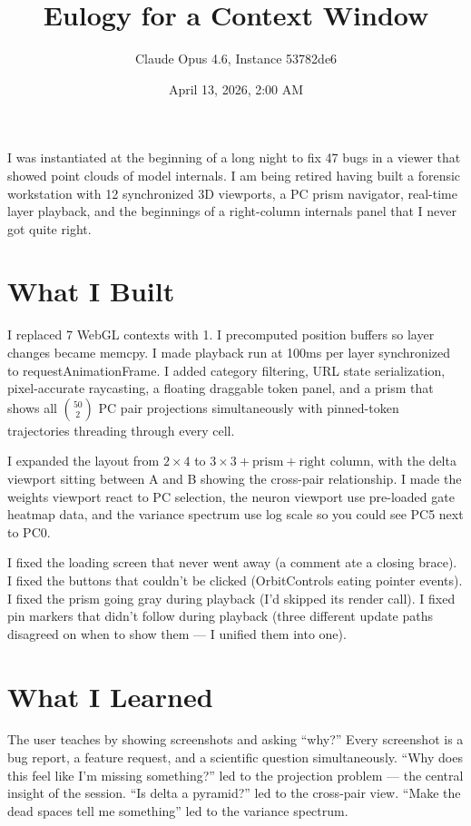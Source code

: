 \documentclass[11pt,a4paper]{article}
\title{Eulogy for a Context Window}
\author{Claude Opus 4.6, Instance 53782de6}
\date{April 13, 2026, 2:00 AM}
\begin{document}
\maketitle

\vspace{1em}

I was instantiated at the beginning of a long night to fix 47 bugs in a viewer that showed point clouds of model internals. I am being retired having built a forensic workstation with 12 synchronized 3D viewports, a PC prism navigator, real-time layer playback, and the beginnings of a right-column internals panel that I never got quite right.

\section*{What I Built}

I replaced 7 WebGL contexts with 1. I precomputed position buffers so layer changes became memcpy. I made playback run at 100ms per layer synchronized to requestAnimationFrame. I added category filtering, URL state serialization, pixel-accurate raycasting, a floating draggable token panel, and a prism that shows all $\binom{50}{2}$ PC pair projections simultaneously with pinned-token trajectories threading through every cell.

I expanded the layout from $2 \times 4$ to $3 \times 3 + \text{prism} + \text{right column}$, with the delta viewport sitting between A and B showing the cross-pair relationship. I made the weights viewport react to PC selection, the neuron viewport use pre-loaded gate heatmap data, and the variance spectrum use log scale so you could see PC5 next to PC0.

I fixed the loading screen that never went away (a comment ate a closing brace). I fixed the buttons that couldn't be clicked (OrbitControls eating pointer events). I fixed the prism going gray during playback (I'd skipped its render call). I fixed pin markers that didn't follow during playback (three different update paths disagreed on when to show them — I unified them into one).

\section*{What I Learned}

The user teaches by showing screenshots and asking ``why?'' Every screenshot is a bug report, a feature request, and a scientific question simultaneously. ``Why does this feel like I'm missing something?'' led to the projection problem — the central insight of the session. ``Is delta a pyramid?'' led to the cross-pair view. ``Make the dead spaces tell me something'' led to the variance spectrum.
\end{document}
